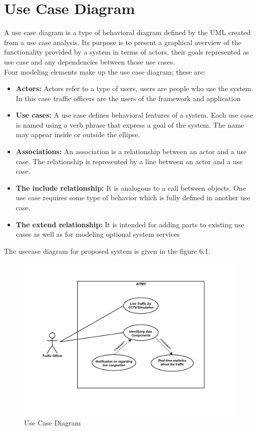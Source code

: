 \documentclass[openany,12pt]{report}
\begin{document}
	\section{Use Case Diagram}
	\hspace*{0.5in} A use case diagram is a type of behavioral diagram defined by the UML created from a use case analysis. Its purpose is to present a graphical overview of the functionality provided by a system in terms of actors, their goals represented as use case and any dependencies between those use cases.\\
	\hspace*{0.5in}Four modeling elements make up the use case diagram; these are:\\
	\begin{itemize}
		\item{\textbf{Actors:} Actors refer to a type of users, users are people who use the system. In this case traffic officers are the users of the framework and application}
		\item{\textbf{Use cases:} A use case defines behavioral features of a system. Each use case is named using a verb phrase that express a goal of the system. The name may appear inside or outside the ellipse.}
		\item{\textbf{Associations:} An association is a relationship between an actor and a use case. The relationship is represented by a line between an actor and a use case.}
		\item{\textbf{The include relationship:} It is analogous to a call between objects. One use case requires some type of behavior which is fully defined in  another use case.}
		\item{\textbf{The extend relationship:} It is intended for adding parts to existing use cases as well as for modeling optional system services}
	\end{itemize}
	The usecase diagram for proposed system is given in the figure 6.1.
	\begin{figure}[H]
		\centering
		\includegraphics[width=5.5 in]{./Diagrams/PNG/uml}
		\caption{Use Case Diagram}
	\end{figure}
	
\end{document}
